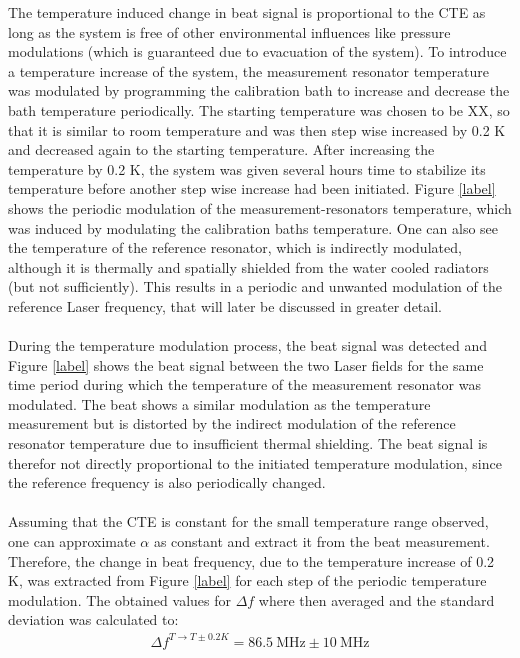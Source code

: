 The temperature induced change in beat signal is proportional to the CTE as long as the system is free of other environmental influences like pressure modulations (which is guaranteed due to evacuation of the system). To introduce a temperature increase of the system, the measurement resonator temperature was modulated by programming the calibration bath to increase and decrease the bath temperature periodically. The starting temperature was chosen to be XX, so that it is similar to room temperature and was then step wise increased by 0.2 K and decreased again to the starting temperature. After increasing the temperature by 0.2 K, the system was given several hours time to stabilize its temperature before another step wise increase had been initiated. Figure \ref{label} shows the periodic modulation of the measurement-resonators temperature, which was induced by modulating the calibration baths temperature. One can also see the temperature of the reference resonator, which is indirectly modulated, although it is thermally and spatially shielded from the water cooled radiators (but not sufficiently). This results in a periodic and unwanted modulation of the reference Laser frequency, that will later be discussed in greater detail.\\\\
During the temperature modulation process, the beat signal was detected and Figure \ref{label} shows the beat signal between the two Laser fields for the same time period during which the temperature of the measurement resonator was modulated. The beat shows a similar modulation as the temperature measurement but is distorted by the indirect modulation of the reference resonator temperature due to insufficient thermal shielding. The beat signal is therefor not directly proportional to the initiated temperature modulation, since the reference frequency is also periodically changed.\\\\
Assuming that the CTE is constant for the small temperature range observed, one can approximate $\alpha$ as constant and extract it from the beat measurement. Therefore, the change in beat frequency, due to the temperature increase of 0.2 K, was extracted from Figure \ref{label} for each step of the periodic temperature modulation. The obtained values for $\Delta f$ where then averaged and the standard deviation was calculated to:
 \begin{align}
 	\Delta f^{T\rightarrow T \pm 0.2K} = 86.5 \ \text{MHz} \pm 10 \ \text{MHz}
 \end{align}
